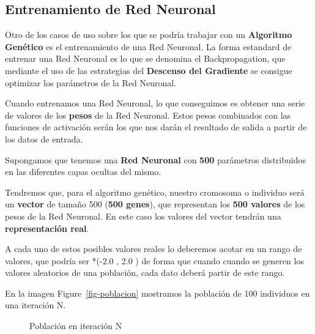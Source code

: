\documentclass[
  a4paper,
  DIV=11,
  numbers=noendperiod]{scrreprt}
\begin{document}
\subsection{Entrenamiento de Red
Neuronal}\label{entrenamiento-de-red-neuronal}

Otro de los casos de uso sobre los que se podría trabajar con un
\textbf{Algoritmo Genético} es el entrenamiento de una Red Neuronal. La
forma estandard de entrenar una Red Neuronal es lo que se denomina el
Backpropagation, que mediante el uso de las estrategias del
\textbf{Descenso del Gradiente} se consigue optimizar los parámetros de
la Red Neuronal.

Cuando entrenamos una Red Neuronal, lo que conseguimos es obtener una
serie de valores de los \textbf{pesos} de la Red Neuronal. Estos pesos
combinados con las funciones de activación serán los que nos darán el
resultado de salida a partir de los datos de entrada.

Supongamos que tenemos una \textbf{Red Neuronal} con \textbf{500}
parámetros distribuidos en las diferentes capas ocultas del mismo.

Tendremos que, para el algoritmo genético, nuestro cromosoma o individuo
será un \textbf{vector} de tamaño 500 (\textbf{500 genes}), que
representan los \textbf{500 valores} de los pesos de la Red Neuronal. En
este caso los valores del vector tendrán una \textbf{representación
real}.

A cada uno de estos posibles valores reales lo deberemos acotar en un
rango de valores, que podría ser *(-2.0 , 2.0 ) de forma que cuando
cuando se generen los valores aleatorios de una población, cada dato
deberá partir de este rango.

En la imagen Figure~\ref{fig-poblacion} mostramos la población de 100
individuos en una iteración N.

\begin{figure}


\caption{\label{fig-poblacion_entrenamiento_red}Población en iteración
N}

\end{figure}%
\end{document}
